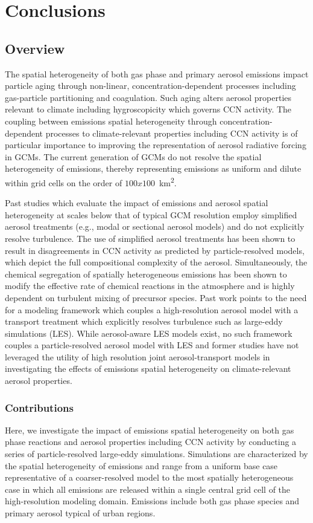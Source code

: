 \chapter{Conclusions}

\section{Overview}
The spatial heterogeneity of both gas phase and primary aerosol emissions impact particle aging through non-linear, concentration-dependent processes including gas-particle partitioning and coagulation. Such aging alters aerosol properties relevant to climate including hygroscopicity which governs CCN activity. The coupling between emissions spatial heterogeneity through concentration-dependent processes to climate-relevant properties including CCN activity is of particular importance to improving the representation of aerosol radiative forcing in GCMs. The current generation of GCMs do not resolve the spatial heterogeneity of emissions, thereby representing emissions as uniform and dilute within grid cells on the order of $100x100$~\si{km^2}. 

Past studies which evaluate the impact of emissions and aerosol spatial heterogeneity at scales below that of typical GCM resolution employ simplified aerosol treatments (e.g., modal or sectional aerosol models) and do not explicitly resolve turbulence. The use of simplified aerosol treatments has been shown to result in disagreements in CCN activity as predicted by particle-resolved models, which depict the full compositional complexity of the aerosol. Simultaneously, the chemical segregation of spatially heterogeneous emissions has been shown to modify the effective rate of chemical reactions in the atmosphere and is highly dependent on turbulent mixing of precursor species. Past work points to the need for a modeling framework which couples a high-resolution aerosol model with a transport treatment which explicitly resolves turbulence such as large-eddy simulations (LES). While aerosol-aware LES models exist, no such framework couples a particle-resolved aerosol model with LES and former studies have not leveraged the utility of high resolution joint aerosol-transport models in investigating the effects of emissions spatial heterogeneity on climate-relevant aerosol properties. 

\subsection{Contributions}
Here, we investigate the impact of emissions spatial heterogeneity on both gas phase reactions and aerosol properties including CCN activity by conducting a series of particle-resolved large-eddy simulations. Simulations are characterized by the spatial heterogeneity of emissions and range from a uniform base case representative of a coarser-resolved model to the most spatially heterogeneous case in which all emissions are released within a single central grid cell of the high-resolution modeling domain. Emissions include both gas phase species and primary aerosol typical of urban regions. 

